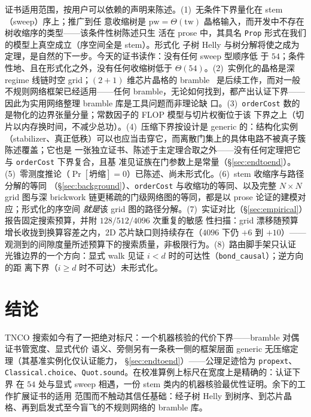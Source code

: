 \documentclass[11pt]{ctexart}
\newcommand{\pw}{\mathrm{pw}}
\newcommand{\tw}{\mathrm{tw}}
\begin{document}
证书适用范围，按用户可以依赖的声明来陈述。(1)~无条件下界量化在 stem（sweep）序上；推广到任
意收缩树是 $\pw=\Theta(\tw)$ 晶格输入，而开发中不存在树收缩序的类型——该条件性树陈述只生
活在 prose 中，其具名 \texttt{Prop} 形式在我们的模型上真空成立（序空间全是 stem）。形式化
子树 Helly 与树分解将使之成为定理，是自然的下一步。今天的证书读作：没有任何 sweep 型顺序低
于 $54$；条件性地、且在形式化之外，没有任何收缩树低于 $\Theta(54)$。(2)~实例化的晶格是深 regime 线链时空 grid；$(2{+}1)$ 维芯片晶格的
bramble~\cite{kozawa2014treewidth} 是后续工作，而对一般不规则网络框架已经适用——任何
bramble，无论如何找到，都产出认证下界——因此为实用网络整理 bramble 库是工具问题而非理论缺
口。(3)~\texttt{orderCost} 数的是物化的边界张量分量；常数因子的 FLOP 模型与切片权衡位于该
下界之上（切片以内存换时间，不减少总功）。(4)~压缩下界按设计是 generic 的：结构化实例
（stabilizer、真正低秩）可以也应当击穿它，而离散门集上的具体电路不被真子簇陈述覆盖；它也是
一张独立证书、陈述于主定理合取之外——没有任何定理把它与 \texttt{orderCost} 下界复合，且基
准见证族在门参数上是常量（\S\ref{sec:endtoend}）。
(5)~零测度推论（$\Pr[\text{坍缩}]=0$）已陈述、尚未形式化。(6)~stem 收缩序与路径分解的等同
（\S\ref{sec:background}）、\texttt{orderCost} 与收缩功的等同、以及完整 $N\times N$ grid
图与深 brickwork 链更稀疏的门级网络图的等同，都是以 prose 论证的建模对应；形式化的序空间
\emph{就是}该 grid 图的路径分解。(7)~实证对比（\S\ref{sec:empirical}）报告固定搜索预算，并附 $128/512/4096$ 次重复的敏感
性扫描：grid 漂移随预算增长收拢到换算容差之内，2D 芯片缺口则持续存在（$4096$ 下仍
$+6$ 到 $+10$）——观测到的间隙度量所述预算下的搜索质量，非极限行为。(8)~路由脚手架只认证
光锥边界的一个方向：显式 walk 见证 $i<d$ 时的可达性（\texttt{bond\_causal}）；逆方向的距
离下界（$i\ge d$ 时不可达）未形式化。

\section{结论}\label{sec:conclusion}

TNCO 搜索如今有了一把绝对标尺：一个机器核验的代价下界——bramble 对偶证书管宽度、显式代价
语义、旁侧另有一条秩一侧的框架层面 generic 无压缩定理（其基准实例化仅认证能力，
\S\ref{sec:endtoend}）——公理足迹恰为 \texttt{propext}、
\texttt{Classical.choice}、\texttt{Quot.sound}。在校准算例上标尺在宽度上是精确的：认证下界
在 $54$ 处与显式 sweep 相遇，一份 stem 类内的机器核验最优性证明。余下的工作扩展证书的适用
范围而不触动其信任基础：经子树 Helly 到树序、到芯片晶格、再到启发式至今盲飞的不规则网络的
bramble 库。
\end{document}
